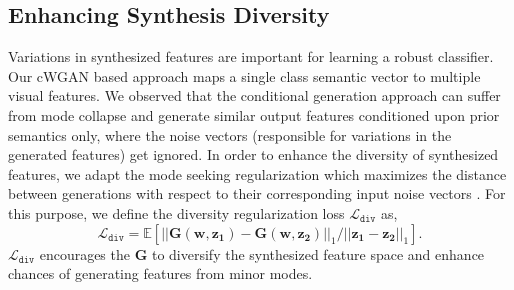 \documentclass[runningheads]{llncs}
\begin{document}
\subsection{Enhancing Synthesis Diversity} Variations in synthesized features are important for learning a robust classifier. Our cWGAN based approach maps a single class semantic vector to multiple visual features. We observed that the conditional generation approach can suffer from mode collapse \cite{salimans2016improved} and generate similar output features conditioned upon prior semantics only, where the noise vectors (responsible for variations in the generated features) get ignored. In order to enhance the diversity of synthesized features, we adapt the mode seeking regularization which maximizes the distance between generations with respect to their corresponding input noise vectors \cite{mao2019mode}. For this purpose, we define the diversity regularization loss $\mathcal{L}_{\texttt{div}}$ as,
\begin{equation}
    \mathcal{L}_{\texttt{div}} = \mathbb{E} [ || \mathbf{G}(\mathbf{w},\mathbf{z_1}) -  \mathbf{G}(\mathbf{w},\mathbf{z_2}) ||_1/||\mathbf{z_1}-\mathbf{z_2}||_1].
\end{equation}
$\mathcal{L}_{\texttt{div}}$ encourages the  $\mathbf{G}$ to diversify the synthesized feature space and enhance chances of generating features from minor modes. 



 
\end{document}
